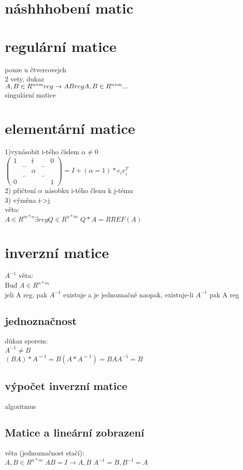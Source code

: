 \documentclass[a4paper]{article}
\begin{document}
\section{náshhhobení matic}



\section{regulární matice}
pouze u čtvercovejch\\
2 vety, dukaz\\

$
A,B\in R^{n*m} reg \rightarrow A B reg\\
A,B\in R^{n*m} ...
$\\

singulární matice


\section{elementární matice}
1)vynásobit i-tého číslem $\alpha\neq 0$\\
$
\left(\begin{array}{ccccc}
  1 &   &  ř &   & 0 \\
     & .. &   &  .. &   \\
     &   & \alpha   &   &   \\
     & .. &   & ..  &   \\
 0  &   &   &   &  1 
\end{array}\right)
=I+(\alpha=1)*e_ie_i^T
$\\

2) přičtení $\alpha$  násobku i-tého členu k j-tému\\



3) výměna i->j\\



věta: \\
$A\in R^{m*n} \exists reg Q\in R^{n*m}$
$Q*A=RREF(A)$



\section{inverzní matice}
$A^{-1}$
věta: \\
Buď $A\in R^{n*m}$\\
jeli A reg, pak $A^{-1}$ existuje a je jednoznačně naopak, existuje-li $A^{-1}$ pak A reg
\subsection{jednoznačnost}
důkaz sporem:\\
$A^{-1} \neq B$\\
$(BA)*A^{=1} = B(A*A^{=1}) = BAA^{-1} = B$
\\
\subsection{výpočet inverzní matice}
algoritmus




\subsection{Matice a lineární zobrazení}
věta (jednoznačnost stačí):\\
$A,B\in R^{n*m}$
$AB=I \rightarrow A,B$
$A^{-1}=B, B^{-1}=A$
\end{document}
